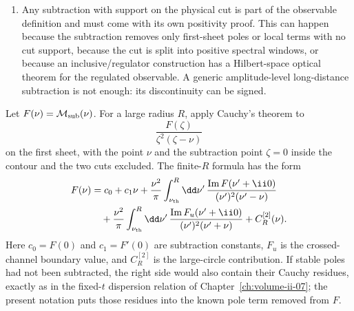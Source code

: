\begin{hypothesis}
\begin{enumerate}
\[  \]
  after the same pole and infrared subtractions have been accounted for.  The
  equality is the forward normalization derived in
  Chapter~\ref{ch:volume-ii-07}.
  \item Any subtraction with support on the physical cut is part of the
  observable definition and must come with its own positivity proof.  This can
  happen because the subtraction removes only first-sheet poles or local terms
  with no cut support, because the cut is split into positive spectral windows,
  or because an inclusive/regulator construction has a Hilbert-space optical
  theorem for the regulated observable.  A generic amplitude-level
  long-distance subtraction is not enough: its discontinuity can be signed.
\end{enumerate}
\end{hypothesis}

Let \(F(\nu)=\mathcal M_{\rm sub}(\nu)\).  For a large radius \(R\), apply
Cauchy's theorem to
\[
  \frac{F(\zeta)}{\zeta^2(\zeta-\nu)}
\]
on the first sheet, with the point \(\nu\) and the subtraction point
\(\zeta=0\) inside the contour and the two cuts excluded.  The finite-\(R\)
formula has the form
\begin{equation}
\begin{aligned}
  F(\nu)
  &=
  c_0+c_1\nu
  +
  \frac{\nu^2}{\pi}
  \int_{\nu_{\rm th}}^R
  \dd\nu'\,
  \frac{\operatorname{Im}F(\nu'+\ii0)}
       {(\nu')^2(\nu'-\nu)}
\\
  &\quad
  +
  \frac{\nu^2}{\pi}
  \int_{\nu_{\rm th}}^R
  \dd\nu'\,
  \frac{\operatorname{Im}F_u(\nu'+\ii0)}
       {(\nu')^2(\nu'+\nu)}
  +
  C_R^{[2]}(\nu).
\end{aligned}
\label{eq:forward-twice-subtracted-both-cuts}
\end{equation}
Here \(c_0=F(0)\) and \(c_1=F'(0)\) are subtraction constants,
\(F_u\) is the crossed-channel boundary value, and \(C_R^{[2]}\) is the
large-circle contribution.  If stable poles had not been subtracted, the right
side would also contain their Cauchy residues, exactly as in the fixed-\(t\)
dispersion relation of Chapter~\ref{ch:volume-ii-07}; the present notation puts
those residues into the known pole term removed from \(F\).


